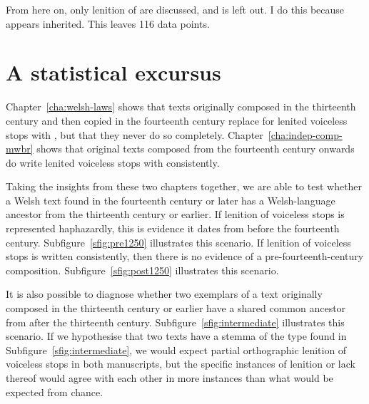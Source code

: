 From here on, only lenition of  are discussed, and  is left out. I do this because  appears inherited. This leaves 116 data points.

\section{A statistical excursus}
\label{sec:statistical-excursus}

Chapter~\ref{cha:welsh-laws} shows that texts originally composed in the thirteenth century and then copied in the fourteenth century replace  for lenited voiceless stops with , but that they never do so completely. Chapter~\ref{cha:indep-comp-mwbr} shows that original texts composed from the fourteenth century onwards do write lenited voiceless stops with  consistently.

Taking the insights from these two chapters together, we are able to test whether a Welsh text found in the fourteenth century or later has a Welsh-language ancestor from the thirteenth century or earlier. If lenition of voiceless stops is represented haphazardly, this is evidence it dates from before the fourteenth century. Subfigure~\ref{sfig:pre1250} illustrates this scenario. If lenition of voiceless stops is written consistently, then there is no evidence of a pre-fourteenth-century composition. Subfigure~\ref{sfig:post1250} illustrates this scenario.

It is also possible to diagnose whether two exemplars of a text originally composed in the thirteenth century or earlier have a shared common ancestor from after the thirteenth century. Subfigure~\ref{sfig:intermediate} illustrates this scenario. If we hypothesise that two texts have a stemma of the type found in Subfigure~\ref{sfig:intermediate}, we would expect partial orthographic lenition of voiceless stops in both manuscripts, but the specific instances of lenition or lack thereof would agree with each other in more instances than what would be expected from chance.


